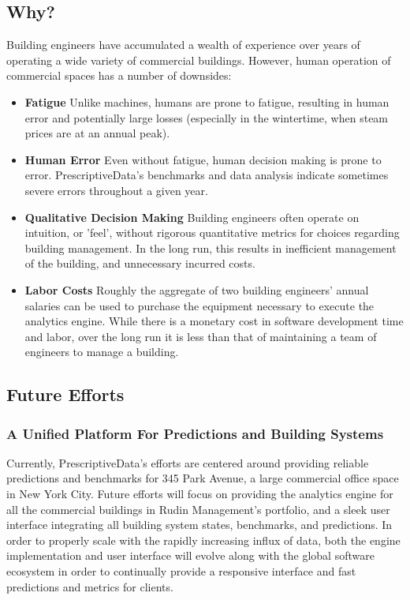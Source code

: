 \documentclass[12pt]{article}
\begin{document}
\subsection*{Why?}
Building engineers have accumulated a wealth of experience over years of
operating a wide variety of commercial buildings. However, human operation of
commercial spaces has a number of downsides:
\begin{itemize}
	\item{\textbf{Fatigue}} Unlike machines, humans are prone to fatigue,
		resulting in human error and potentially large losses (especially in the
		wintertime, when steam prices are at an annual peak).
	\item{\textbf{Human Error}} Even without fatigue, human decision making is
		prone to error. PrescriptiveData's benchmarks and data analysis indicate
		sometimes severe errors throughout a given year.
	\item{\textbf{Qualitative Decision Making}} Building engineers often operate
		on intuition, or 'feel', without rigorous quantitative metrics for choices
		regarding building management. In the long run, this results in
		inefficient management of the building, and unnecessary incurred costs.
	\item{\textbf{Labor Costs}} Roughly the aggregate of two building engineers' annual
		salaries can be used to purchase the equipment necessary to execute the
		analytics engine. While there is a monetary cost in
		software development time and labor, over the long run it is less than that
		of maintaining a team of engineers to manage a building. 

	

\end{itemize}
\subsection*{Future Efforts}
\subsubsection*{A Unified Platform For Predictions and Building
Systems}
Currently, PrescriptiveData's efforts are centered around providing reliable
predictions and benchmarks for 345 Park Avenue, a large commercial office space
in New York City. Future efforts will focus on providing the
analytics engine for all the commercial buildings in Rudin Management's
portfolio, and a sleek user interface integrating all building system states,
benchmarks, and predictions. In order to properly scale with the rapidly increasing influx of data, both the engine implementation and user interface will evolve along with
the global software ecosystem in order to continually provide a responsive
interface and fast predictions and metrics for clients.
\end{document}
